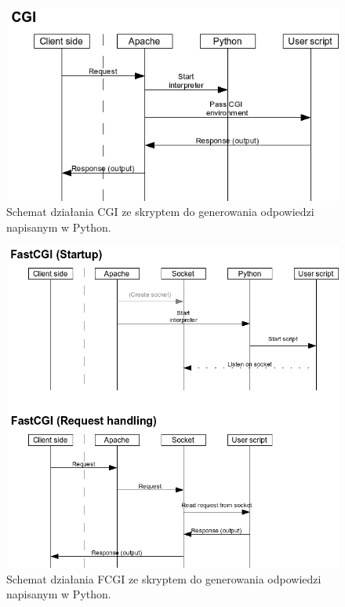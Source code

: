 \documentclass[eng]{mgr}
\begin{document}
			\begin{center}
				\begin{figure}[ht]
					\centering
					\includegraphics[scale=0.8]{flow_cgi.png}
					\caption{Schemat działania CGI ze skryptem do generowania odpowiedzi napisanym w Python. \cite{fcgi}}
				\end{figure}
			\end{center}
		
			\begin{center}
				\begin{figure}[ht]
					\centering
					\includegraphics[scale=0.8]{flow_fastcgi.png}
					\caption{Schemat działania FCGI ze skryptem do generowania odpowiedzi napisanym w Python. \cite{fcgi}}
				\end{figure}
			\end{center}
		
\end{document}
